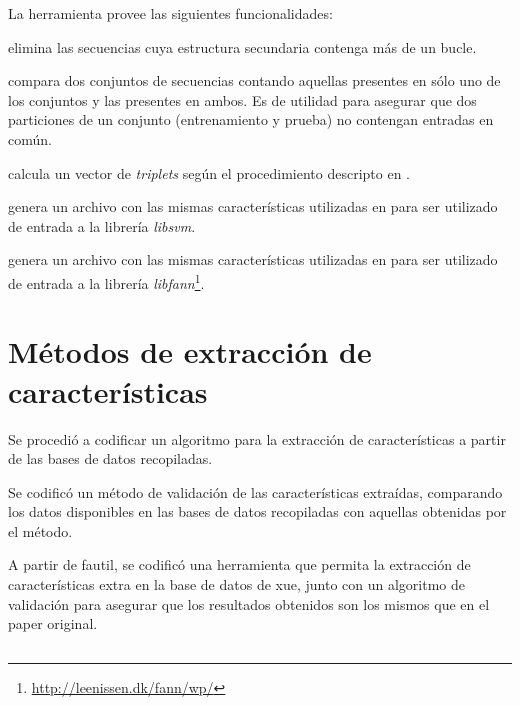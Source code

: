 \documentclass[12pt,bibliography=openstyle,DIV=12,parskip=half-]{scrartcl}
\begin{document}
La herramienta  provee las siguientes funcionalidades:
\begin{description*}
\item[\mono{strip}] elimina las secuencias cuya estructura secundaria
  contenga más de un bucle.
\item[\mono{compare}] compara dos conjuntos de secuencias contando
  aquellas presentes en sólo uno de los conjuntos y las presentes en
  ambos. Es de utilidad para asegurar que dos particiones de un
  conjunto (entrenamiento y prueba) no contengan entradas en común.
\item[\mono{triplet}] calcula un vector de \emph{triplets} según el
  procedimiento descripto en \cite{xue}.
\item[\mono{svmout}] genera un archivo con las mismas características
  utilizadas en \cite{xue} para ser utilizado de entrada a la librería
  \emph{libsvm}\cite{svm}.
\item[\mono{fannout}] genera un archivo con las mismas características
  utilizadas en \cite{xue} para ser utilizado de entrada a la librería
  \emph{libfann}\footnote{\url{http://leenissen.dk/fann/wp/}}.
\end{description*}

\section{Métodos de extracción de características}
Se procedió a codificar un algoritmo para la extracción de características
a partir de las bases de datos recopiladas.

Se codificó un método de validación de las características extraídas, comparando
los datos disponibles en las bases de datos recopiladas con aquellas obtenidas por el método.




A partir de fautil, se codificó una herramienta que permita la
extracción de características extra en la base de datos de xue, junto
con un algoritmo de validación para asegurar que los resultados
obtenidos son los mismos que en el paper original.



\subsection{}
%
%
\printbibliography
%
\end{document}
